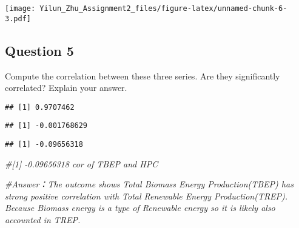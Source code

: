 \documentclass[
]{article}
\newenvironment{Shaded}{\begin{snugshade}}{\end{snugshade}}
\newcommand{\CommentTok}[1]{\textcolor[rgb]{0.56,0.35,0.01}{\textit{#1}}}
\newcommand{\FunctionTok}[1]{\textcolor[rgb]{0.13,0.29,0.53}{\textbf{#1}}}
\newcommand{\NormalTok}[1]{#1}
\newcommand{\SpecialCharTok}[1]{\textcolor[rgb]{0.81,0.36,0.00}{\textbf{#1}}}
\begin{document}
\texttt{[image: Yilun\_Zhu\_Assignment2\_files/figure-latex/unnamed-chunk-6-3.pdf]}

\hypertarget{question-5}{%
\subsection{Question 5}\label{question-5}}

Compute the correlation between these three series. Are they
significantly correlated? Explain your answer.

\begin{Shaded}
\end{Shaded}

\begin{verbatim}
## [1] 0.9707462
\end{verbatim}

\begin{Shaded}
\end{Shaded}

\begin{verbatim}
## [1] -0.001768629
\end{verbatim}

\begin{Shaded}
\end{Shaded}

\begin{verbatim}
## [1] -0.09656318
\end{verbatim}

\begin{Shaded}
\begin{Highlighting}[]
\CommentTok{\#[1] {-}0.09656318  cor of TBEP and HPC}

\CommentTok{\#Answer：The outcome shows Total Biomass Energy Production(TBEP) has strong positive correlation with Total Renewable Energy Production(TREP). Because Biomass energy is a type of Renewable energy so it is likely also accounted in TREP. }
\end{Highlighting}
\end{Shaded}
\end{document}
